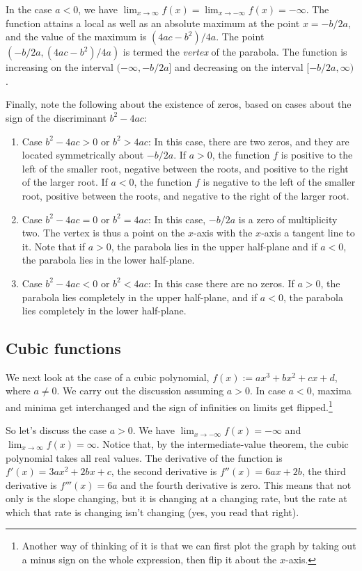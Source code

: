 \documentclass[10pt]{amsart}
\begin{document}
In the case $a < 0$, we have $\lim_{x \to \infty} f(x) = \lim_{x \to
  -\infty} f(x) = -\infty$. The function attains a local as well as an
absolute maximum at the point $x = -b/2a$, and the value of the
maximum is $(4ac - b^2)/4a$. The point $(-b/2a,(4ac - b^2)/4a)$ is
termed the {\em vertex} of the parabola. The function is increasing on
the interval $(-\infty,-b/2a]$ and decreasing on the interval $[-b/2a,\infty)$.

Finally, note the following about the existence of zeros, based on
cases about the sign of the discriminant $b^2 - 4ac$:

\begin{enumerate}
\item Case $b^2 - 4ac > 0$ or $b^2 > 4ac$: In this case, there are two
  zeros, and they are located symmetrically about $-b/2a$. If $a >
  0$, the function $f$ is positive to the left of the smaller root,
  negative between the roots, and positive to the right of the larger
  root. If $a < 0$, the function $f$ is negative to the left of the
  smaller root, positive between the roots, and negative to the right
  of the larger root.
\item Case $b^2 - 4ac = 0$ or $b^2 = 4ac$: In this case, $-b/2a$ is a
  zero of multiplicity two. The vertex is thus a point on the $x$-axis
  with the $x$-axis a tangent line to it. Note that if $a > 0$, the
  parabola lies in the upper half-plane and if $a < 0$, the parabola
  lies in the lower half-plane.
\item Case $b^2 - 4ac < 0$ or $b^2 < 4ac$: In this case there are no
  zeros. If $a > 0$, the parabola lies completely in the upper
  half-plane, and if $a < 0$, the parabola lies completely in the
  lower half-plane.
\end{enumerate}

\subsection{Cubic functions}

We next look at the case of a cubic polynomial, $f(x) := ax^3 + bx^2 +
cx + d$, where $a \ne 0$. We carry out the discussion assuming $a >
0$. In case $a < 0$, maxima and minima get interchanged and the sign
of infinities on limits get flipped.\footnote{Another way of thinking of it is
that we can first plot the graph by taking out a minus sign on the
whole expression, then flip it about the $x$-axis.}

So let's discuss the case $a > 0$. We have $\lim_{x \to -\infty} f(x)
= -\infty$ and $\lim_{x \to \infty} f(x) = \infty$. Notice that, by
the intermediate-value theorem, the cubic polynomial takes all real
values. The derivative of the function is $f'(x) = 3ax^2 + 2bx + c$,
the second derivative is $f''(x) = 6ax + 2b$, the third derivative is
$f'''(x) = 6a$ and the fourth derivative is zero. This means that not
only is the slope changing, but it is changing at a changing rate, but
the rate at which that rate is changing isn't changing (yes, you read
that right).
\end{document}
